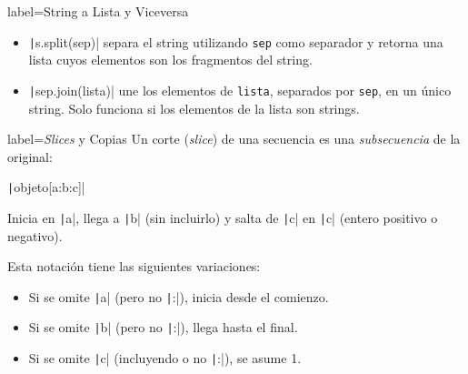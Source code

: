 \begin{contentbox}{label=String a Lista y Viceversa}
    \begin{itemize}
        \item \texttt|s.split(sep)| separa el string utilizando \texttt{sep} como separador y retorna una lista cuyos elementos son los fragmentos del string.
        \item \texttt|sep.join(lista)| une los elementos de \texttt{lista}, separados por \texttt{sep}, en un único string. Solo funciona si los elementos de la lista son strings.
    \end{itemize}
\end{contentbox}

\begin{contentbox}{label=\textit{Slices} y Copias}
    Un \alert{corte} (\textit{slice}) de una secuencia es una \textit{subsecuencia} de la original:
    \begin{center}
        \texttt|objeto[a:b:c]|
    \end{center}
    Inicia en \texttt|a|, llega a \texttt|b| (sin incluirlo) y salta de \texttt|c| en \texttt|c| (entero positivo o negativo).
    
    Esta notación tiene las siguientes variaciones:
    \begin{itemize}
        \item Si se omite \texttt|a| (pero no \texttt|:|), inicia desde el comienzo.
        \item Si se omite \texttt|b| (pero no \texttt|:|), llega hasta el final.
        \item Si se omite \texttt|c| (incluyendo o no \texttt|:|), se asume 1.
    \end{itemize}
\end{contentbox}
